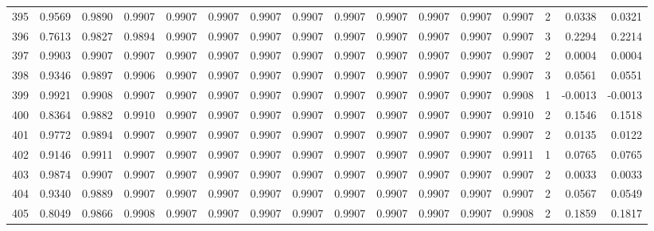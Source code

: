 \begin{tabular}{lrrrrrrrrrrrrrrr}
395 &      0.9569 &  0.9890 &  0.9907 &  0.9907 &  0.9907 &  0.9907 &  0.9907 &  0.9907 &  0.9907 &  0.9907 &   0.9907 &     0.9907 &      2 &                    0.0338 &                     0.0321 \\
396 &      0.7613 &  0.9827 &  0.9894 &  0.9907 &  0.9907 &  0.9907 &  0.9907 &  0.9907 &  0.9907 &  0.9907 &   0.9907 &     0.9907 &      3 &                    0.2294 &                     0.2214 \\
397 &      0.9903 &  0.9907 &  0.9907 &  0.9907 &  0.9907 &  0.9907 &  0.9907 &  0.9907 &  0.9907 &  0.9907 &   0.9907 &     0.9907 &      2 &                    0.0004 &                     0.0004 \\
398 &      0.9346 &  0.9897 &  0.9906 &  0.9907 &  0.9907 &  0.9907 &  0.9907 &  0.9907 &  0.9907 &  0.9907 &   0.9907 &     0.9907 &      3 &                    0.0561 &                     0.0551 \\
399 &      0.9921 &  0.9908 &  0.9907 &  0.9907 &  0.9907 &  0.9907 &  0.9907 &  0.9907 &  0.9907 &  0.9907 &   0.9907 &     0.9908 &      1 &                   -0.0013 &                    -0.0013 \\
400 &      0.8364 &  0.9882 &  0.9910 &  0.9907 &  0.9907 &  0.9907 &  0.9907 &  0.9907 &  0.9907 &  0.9907 &   0.9907 &     0.9910 &      2 &                    0.1546 &                     0.1518 \\
401 &      0.9772 &  0.9894 &  0.9907 &  0.9907 &  0.9907 &  0.9907 &  0.9907 &  0.9907 &  0.9907 &  0.9907 &   0.9907 &     0.9907 &      2 &                    0.0135 &                     0.0122 \\
402 &      0.9146 &  0.9911 &  0.9907 &  0.9907 &  0.9907 &  0.9907 &  0.9907 &  0.9907 &  0.9907 &  0.9907 &   0.9907 &     0.9911 &      1 &                    0.0765 &                     0.0765 \\
403 &      0.9874 &  0.9907 &  0.9907 &  0.9907 &  0.9907 &  0.9907 &  0.9907 &  0.9907 &  0.9907 &  0.9907 &   0.9907 &     0.9907 &      2 &                    0.0033 &                     0.0033 \\
404 &      0.9340 &  0.9889 &  0.9907 &  0.9907 &  0.9907 &  0.9907 &  0.9907 &  0.9907 &  0.9907 &  0.9907 &   0.9907 &     0.9907 &      2 &                    0.0567 &                     0.0549 \\
405 &      0.8049 &  0.9866 &  0.9908 &  0.9907 &  0.9907 &  0.9907 &  0.9907 &  0.9907 &  0.9907 &  0.9907 &   0.9907 &     0.9908 &      2 &                    0.1859 &                     0.1817 \\

\end{tabular}
